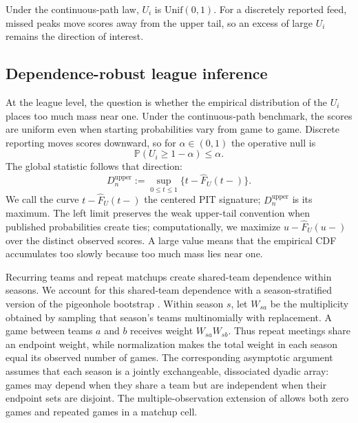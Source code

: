 \documentclass[12pt,letterpaper]{article}  %
\renewcommand{\P}{\mathbb{P}}
\theoremstyle{plain}
\theoremstyle{definition}
\begin{document}
Under the continuous-path law, $U_i$ is $\mathrm{Unif}(0,1)$.
For a discretely reported feed, missed peaks move scores away from the upper tail, so an excess of large $U_i$ remains the direction of interest.

\subsection{Dependence-robust league inference}

At the league level, the question is whether the empirical distribution of the $U_i$ places too much mass near one.
Under the continuous-path benchmark, the scores are uniform even when starting probabilities vary from game to game.
Discrete reporting moves scores downward, so for $\alpha\in(0,1)$ the operative null is
\[
\P(U_i\ge 1-\alpha)\le \alpha.
\]
The global statistic follows that direction:
\[
D_n^{\mathrm{upper}}
  :=\sup_{0\le t\le1}\{t-\hat F_U(t-)\}.
\]
We call the curve $t-\hat F_U(t-)$ the centered PIT signature; $D_n^{\mathrm{upper}}$ is its maximum.
The left limit preserves the weak upper-tail convention when published probabilities create ties; computationally, we maximize $u-\hat F_U(u-)$ over the distinct observed scores.
A large value means that the empirical CDF accumulates too slowly because too much mass lies near one.

Recurring teams and repeat matchups create shared-team dependence within seasons.
We account for this shared-team dependence with a season-stratified version of the pigeonhole bootstrap \citep{Owen2007,DaveziesDHAultfoeuilleGuyonvarch2021}.
Within season $s$, let $W_{sa}$ be the multiplicity obtained by sampling that season's teams multinomially with replacement.
A game between teams $a$ and $b$ receives weight $W_{sa}W_{sb}$.
Thus repeat meetings share an endpoint weight, while normalization makes the total weight in each season equal its observed number of games.
The corresponding asymptotic argument assumes that each season is a jointly exchangeable, dissociated dyadic array: games may depend when they share a team but are independent when their endpoint sets are disjoint.
The multiple-observation extension of \citet{DaveziesDHAultfoeuilleGuyonvarch2021} allows both zero games and repeated games in a matchup cell.
\end{document}
